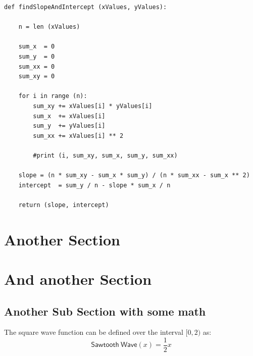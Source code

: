 \documentclass[11pt,letterpaper,twoside]{book}
\begin{document}
\lipsum[20-21]

\begin{tcolorbox}[width=6in]

\begin{verbatim}
def findSlopeAndIntercept (xValues, yValues):

    n = len (xValues)

    sum_x  = 0
    sum_y  = 0
    sum_xx = 0
    sum_xy = 0

    for i in range (n):
        sum_xy += xValues[i] * yValues[i]
        sum_x  += xValues[i]
        sum_y  += yValues[i]
        sum_xx += xValues[i] ** 2

        #print (i, sum_xy, sum_x, sum_y, sum_xx)

    slope = (n * sum_xy - sum_x * sum_y) / (n * sum_xx - sum_x ** 2)
    intercept  = sum_y / n - slope * sum_x / n

    return (slope, intercept) 
\end{verbatim}
\end{tcolorbox}

\lipsum[34]

\section{Another Section}

\lipsum[34-35]

\section{And another Section}

\lipsum[4-5]

\subsection{Another Sub Section with some math}

\lipsum[6-7]
The square wave function can be defined over the interval $[0, 2)$ as:
\[
\mathsf{Sawtooth\ Wave}(x) = \frac{1}{2} x 
\]
\end{document}

